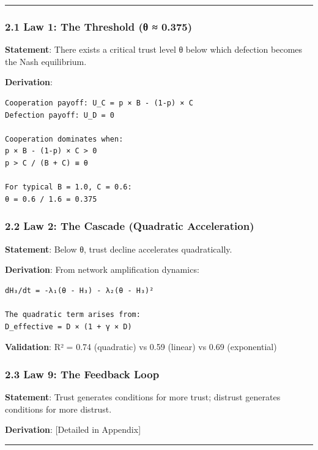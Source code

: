 \documentclass[11pt,letterpaper]{article}
\begin{document}
\begin{center}\rule{0.5\linewidth}{0.5pt}\end{center}

\subsubsection{2.1 Law 1: The Threshold (θ ≈
0.375)}\label{law-1-the-threshold-ux3b8-0.375}

\textbf{Statement}: There exists a critical trust level θ below which
defection becomes the Nash equilibrium.

\textbf{Derivation}:

\begin{verbatim}
Cooperation payoff: U_C = p × B - (1-p) × C
Defection payoff: U_D = 0

Cooperation dominates when:
p × B - (1-p) × C > 0
p > C / (B + C) ≡ θ

For typical B = 1.0, C = 0.6:
θ = 0.6 / 1.6 = 0.375
\end{verbatim}

\subsubsection{2.2 Law 2: The Cascade (Quadratic
Acceleration)}\label{law-2-the-cascade-quadratic-acceleration}

\textbf{Statement}: Below θ, trust decline accelerates quadratically.

\textbf{Derivation}: From network amplification dynamics:

\begin{verbatim}
dH₃/dt = -λ₁(θ - H₃) - λ₂(θ - H₃)²

The quadratic term arises from:
D_effective = D × (1 + γ × D)
\end{verbatim}

\textbf{Validation}: R² = 0.74 (quadratic) vs 0.59 (linear) vs 0.69
(exponential)

\subsubsection{2.3 Law 9: The Feedback
Loop}\label{law-9-the-feedback-loop}

\textbf{Statement}: Trust generates conditions for more trust; distrust
generates conditions for more distrust.

\textbf{Derivation}: {[}Detailed in Appendix{]}

\begin{center}\rule{0.5\linewidth}{0.5pt}\end{center}
\end{document}
